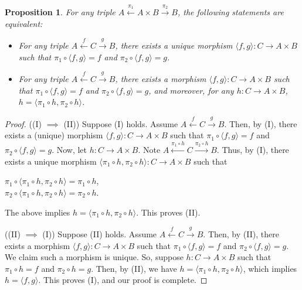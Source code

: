 \documentclass[]{amsbook}
\newcommand{\0}{\mathbf{0}}
\newcommand{\1}{\mathbf{1}}
\newtheorem{prop}{Proposition}
\begin{document}
\setcounter{prop}{26}
\begin{prop}
    For any triple $A \xleftarrow{\pi_1} A \times B \xrightarrow{\pi_2} B$, the
    following statements are equivalent:
    \begin{itemize}
        \item[(I)] For any triple $A \xleftarrow{f} C \xrightarrow{g} B$, there
        exists a unique morphism $\langle f, g \rangle : C \to A \times B$ such
        that $\pi_1 \circ \langle f, g \rangle = f$ and $\pi_2 \circ \langle f,
        g \rangle = g$.
        \item[(II)] For any triple $A \xleftarrow{f} C \xrightarrow{g} B$, there
        exists a morphism $\langle f, g \rangle : C \to A \times B$ such that
        $\pi_1 \circ \langle f, g \rangle = f$ and $\pi_2 \circ \langle f, g
        \rangle = g$, and moreover, for any $h: C \to A \times B$,  $h =
        \langle \pi_1 \circ h, \pi_2 \circ h \rangle$.
    \end{itemize}
\end{prop}
\begin{proof}
    ((I) $\implies$ (II)) Suppose (I) holds. Assume $A \xleftarrow{f} C
    \xrightarrow{g} B$. Then, by (I), there exists a (unique) morphism $\langle
    f, g \rangle : C \to A \times B$ such that $\pi_1 \circ \langle f, g \rangle
    = f$ and $\pi_2 \circ \langle f, g \rangle = g$. Now, let $h: C \to A
    \times B$. Note $A \xleftarrow{\pi_1 \circ h} C \xrightarrow{\pi_2 \circ h}
    B$. Thus, by (I), there exists a unique morphism $\langle \pi_1 \circ h,
    \pi_2 \circ h \rangle : C \to A \times B$ such that
    \begin{center}
        $\pi_1 \circ \langle \pi_1 \circ h, \pi_2 \circ h \rangle =
        \pi_1 \circ h$,\\
        $\pi_2 \circ \langle \pi_1 \circ h, \pi_2 \circ h \rangle =
        \pi_2 \circ h$.
    \end{center}
    The above implies $h = \langle \pi_1 \circ h, \pi_2 \circ h \rangle$. This
    proves (II).

    ((II) $\implies$ (I)) Suppose (II) holds. Assume $A \xleftarrow{f} C
    \xrightarrow{g} B$. Then, by (II), there exists a morphism $\langle f, g
    \rangle : C \to A \times B$ such that $\pi_1 \circ \langle f, g \rangle =
    f$ and $\pi_2 \circ \langle f, g \rangle = g$. We claim such a morphism is
    unique. So, suppose $h: C \to A \times B$ such that $\pi_1 \circ h = f$ and
    $\pi_2 \circ h = g$. Then, by (II), we have $h = \langle \pi_1 \circ h,
    \pi_2 \circ h \rangle$, which implies $h = \langle f, g \rangle$. This
    proves (I), and our proof is complete.
\end{proof}
\end{document}
